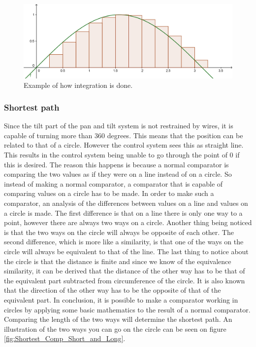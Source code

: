 \begin{figure}[h!]
\centering
\includegraphics[scale=0.4]{Billeder/FPGA/Integration_v1.png}
\caption{Example of how integration is done.}
\label{fig:Integration_v1}
\end{figure}


\subsubsection{Shortest path}

Since the tilt part of the pan and tilt system is not restrained by wires, it is capable of turning more than 360 degrees. This means that the position can be related to that of a circle. However the control system sees this as straight line. This results in the control system being unable to go through the point of 0 if this is desired. The reason this happens is because a normal comparator is comparing the two values as if they were on a line instead of on a circle. So instead of making a normal comparator, a comparator that is capable of comparing values on a circle has to be made.
In order to make such a comparator, an analysis of the differences between values on a line and values on a circle is made. The first difference is that on a line there is only one way to a point, however there are always two ways on a circle. Another thing being noticed is that the two ways on the circle will always be opposite of each other.  The second difference, which is more like a similarity, is that one of the ways on the circle will always be equivalent to that of the line. The last thing to notice about the circle is that the distance is finite and since we know of the equivalence similarity, it can be derived that the distance of the other way has to be that of the equivalent part subtracted from circumference of the circle. It is also known that the direction of the other way has to be the opposite of that of the equivalent part. In conclusion, it is possible to make a comparator working in circles by applying some basic mathematics to the result of a normal comparator. Comparing the length of the two ways will determine the shortest path. An illustration of the two ways you can go on the circle can be seen on figure \ref{fig:Shortest_Comp_Short_and_Long}.


